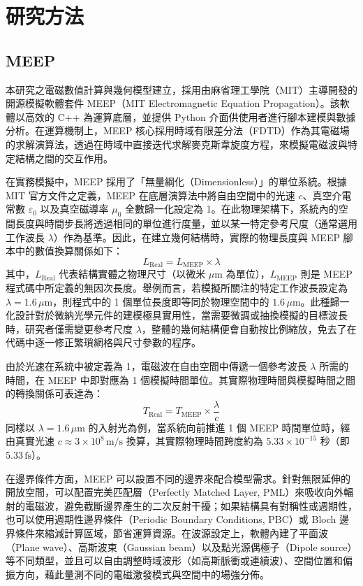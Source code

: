 \chapter{研究方法}
\section{MEEP}

本研究之電磁數值計算與幾何模型建立，採用由麻省理工學院（MIT）主導開發的開源模擬軟體套件 MEEP（MIT Electromagnetic Equation Propagation）。該軟體以高效的 C++ 為運算底層，並提供 Python 介面供使用者進行腳本建模與數據分析。在運算機制上，MEEP 核心採用時域有限差分法（FDTD）作為其電磁場的求解演算法，透過在時域中直接迭代求解麥克斯韋旋度方程，來模擬電磁波與特定結構之間的交互作用。

在實務模擬中，MEEP 採用了「無量綱化（Dimensionless）」的單位系統。根據 MIT 官方文件之定義，MEEP 在底層演算法中將自由空間中的光速 $c$、真空介電常數 $\varepsilon_0$ 以及真空磁導率 $\mu_0$ 全數歸一化設定為 1。在此物理架構下，系統內的空間長度與時間步長將透過相同的單位進行度量，並以某一特定參考尺度（通常選用工作波長 $\lambda$）作為基準。因此，在建立幾何結構時，實際的物理長度與 MEEP 腳本中的數值換算關係如下：
\begin{equation}
	L_{\text{Real}} = L_{\text{MEEP}} \times \lambda
\end{equation}
其中，$L_{\text{Real}}$ 代表結構實體之物理尺寸（以微米 $\mu\text{m}$ 為單位），$L_{\text{MEEP}}$ 則是 MEEP 程式碼中所定義的無因次長度。舉例而言，若模擬所關注的特定工作波長設定為 $\lambda = 1.6\,\mu\text{m}$，則程式中的 1 個單位長度即等同於物理空間中的 $1.6\,\mu\text{m}$。此種歸一化設計對於微納光學元件的建模極具實用性，當需要微調或抽換模擬的目標波長時，研究者僅需變更參考尺度 $\lambda$，整體的幾何結構便會自動按比例縮放，免去了在代碼中逐一修正繁瑣網格與尺寸參數的程序。

由於光速在系統中被定義為 1，電磁波在自由空間中傳遞一個參考波長 $\lambda$ 所需的時間，在 MEEP 中即對應為 1 個模擬時間單位。其實際物理時間與模擬時間之間的轉換關係可表達為：
\begin{equation}
	T_{\text{Real}} = T_{\text{MEEP}} \times \frac{\lambda}{c}
\end{equation}
同樣以 $\lambda = 1.6\,\mu\text{m}$ 的入射光為例，當系統向前推進 1 個 MEEP 時間單位時，經由真實光速 $c \approx 3 \times 10^{8}\,\text{m/s}$ 換算，其實際物理時間跨度約為 $5.33 \times 10^{-15}$ 秒（即 $5.33\,\text{fs}$）。

在邊界條件方面，MEEP 可以設置不同的邊界來配合模型需求。針對無限延伸的開放空間，可以配置完美匹配層（Perfectly Matched Layer, PML）來吸收向外輻射的電磁波，避免截斷邊界產生的二次反射干擾；如果結構具有對稱性或週期性，也可以使用週期性邊界條件（Periodic Boundary Conditions, PBC）或 Bloch 邊界條件來縮減計算區域，節省運算資源。在波源設定上，軟體內建了平面波（Plane wave）、高斯波束（Gaussian beam）以及點光源偶極子（Dipole source）等不同類型，並且可以自由調整時域波形（如高斯脈衝或連續波）、空間位置和偏振方向，藉此量測不同的電磁激發模式與空間中的場強分佈。

